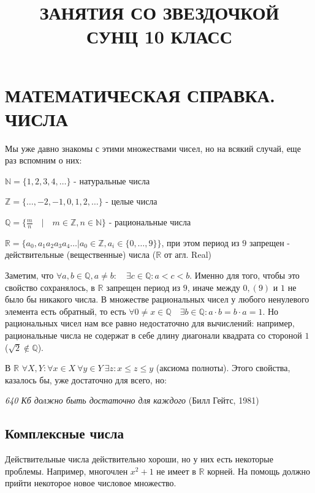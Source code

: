 \documentclass[a4paper,twocolumn,12pt]{article}			%
\title{ЗАНЯТИЯ СО ЗВЕЗДОЧКОЙ\\СУНЦ 10 КЛАСС}
\date{}
\begin{document}
	\maketitle
	
	\section{МАТЕМАТИЧЕСКАЯ СПРАВКА. ЧИСЛА}
	
	Мы уже давно знакомы с этими множествами чисел, но на всякий случай, еще раз вспомним о них:
	
	$\mathbb{N} = \{1, 2, 3, 4, \ldots\}$ - натуральные числа
	
	$\mathbb{Z} = \{\ldots, -2, -1, 0, 1, 2, \ldots\}$ - целые числа
	
	$\mathbb{Q} = \{\frac{m}{n} \quad | \quad m \in \mathbb{Z}, n \in \mathbb{N}\}$ - рациональные числа
	
	$\mathbb{R} = \{a_0,a_1a_2a_3a_4\ldots |  a_0 \in \mathbb{Z}, a_i \in \{0,\ldots,9\}\}$, при этом период из $9$ запрещен - действительные (вещественные) числа ($\mathbb{R}$ от агл. Real)
	
	Заметим, что $\forall a, b \in \mathbb{Q}, a \neq b: \quad \exists c \in \mathbb{Q}: a < c < b$. Именно для того, чтобы это свойство сохранялось, в $\mathbb{R}$ запрещен период из $9$, иначе между $0,(9)$ и $1$ не было бы никакого числа. В множестве рациональных чисел у любого ненулевого элемента есть обратный, то есть $\forall 0 \neq x \in \mathbb{Q} \quad \exists b \in \mathbb{Q}: a \cdot b = b \cdot a = 1$. Но рациональных чисел нам все равно недостаточно для вычислений: например, рациональные числа не содержат в себе длину диагонали квадрата со стороной $1$ ($\sqrt{2} \notin \mathbb{Q}$).
	
	В $\mathbb{R}$ $\forall X, Y: \forall x \in X \ \forall y \in Y \ \exists z: x \leq z \leq y$ (аксиома полноты). Этого свойства, казалось бы, уже достаточно для всего, но:
	
	\begin{displayquote}
	\textit{640 Кб должно быть достаточно для каждого} (Билл Гейтс, 1981)
	\end{displayquote}
	
	
	\subsection{Комплексные числа}
	
	Действительные числа действительно хороши, но у них есть некоторые проблемы. Например, многочлен $x^2 + 1$ не имеет в $\mathbb{R}$ корней. На помощь должно прийти некоторое новое числовое множество.
		
\end{document}
